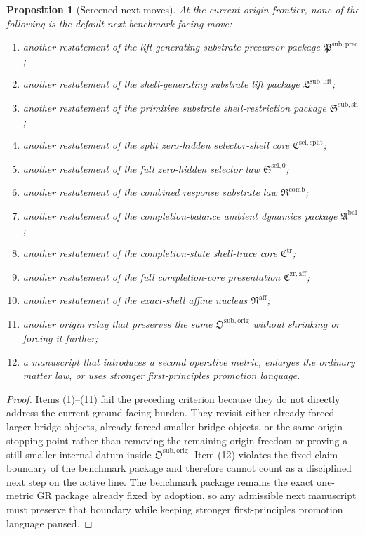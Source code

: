 \documentclass[11pt]{article}
\newcommand{\CompletionCore}{\mathfrak C^{\mathrm{zr,aff}}}
\newcommand{\TraceCore}{\mathfrak C^{\mathrm{tr}}}
\newcommand{\AffineNucleus}{\mathfrak N^{\mathrm{aff}}}
\newcommand{\AmbientPackage}{\mathfrak A^{\mathrm{bal}}}
\newcommand{\CombinedLaw}{\mathfrak R^{\mathrm{comb}}}
\newcommand{\SelectorLaw}{\mathfrak S^{\mathrm{sel},0}}
\newcommand{\SelectorCore}{\mathfrak C^{\mathrm{sel,split}}}
\newcommand{\ShellRestriction}{\mathfrak S^{\mathrm{sub,sh}}}
\newcommand{\LiftPackage}{\mathfrak L^{\mathrm{sub,lift}}}
\newcommand{\PrecursorPackage}{\mathfrak P^{\mathrm{sub,prec}}}
\newcommand{\OriginPackage}{\mathfrak O^{\mathrm{sub,orig}}}
\newtheorem{proposition}{Proposition}
\begin{document}
\begin{proposition}[Screened next moves]
At the current origin frontier, none of the following is the default next benchmark-facing move:
\begin{enumerate}
    \item another restatement of the lift-generating substrate precursor package \(\PrecursorPackage\);
    \item another restatement of the shell-generating substrate lift package \(\LiftPackage\);
    \item another restatement of the primitive substrate shell-restriction package \(\ShellRestriction\);
    \item another restatement of the split zero-hidden selector-shell core \(\SelectorCore\);
    \item another restatement of the full zero-hidden selector law \(\SelectorLaw\);
    \item another restatement of the combined response substrate law \(\CombinedLaw\);
    \item another restatement of the completion-balance ambient dynamics package \(\AmbientPackage\);
    \item another restatement of the completion-state shell-trace core \(\TraceCore\);
    \item another restatement of the full completion-core presentation \(\CompletionCore\);
    \item another restatement of the exact-shell affine nucleus \(\AffineNucleus\);
    \item another origin relay that preserves the same \(\OriginPackage\) without shrinking or forcing it further;
    \item a manuscript that introduces a second operative metric, enlarges the ordinary matter law, or uses stronger first-principles promotion language.
\end{enumerate}
\end{proposition}

\begin{proof}
Items (1)--(11) fail the preceding criterion because they do not directly address the current ground-facing burden. They revisit either already-forced larger bridge objects, already-forced smaller bridge objects, or the same origin stopping point rather than removing the remaining origin freedom or proving a still smaller internal datum inside \(\OriginPackage\). Item (12) violates the fixed claim boundary of the benchmark package and therefore cannot count as a disciplined next step on the active line. The benchmark package remains the exact one-metric GR package already fixed by adoption, so any admissible next manuscript must preserve that boundary while keeping stronger first-principles promotion language paused.
\end{proof}
\end{document}
